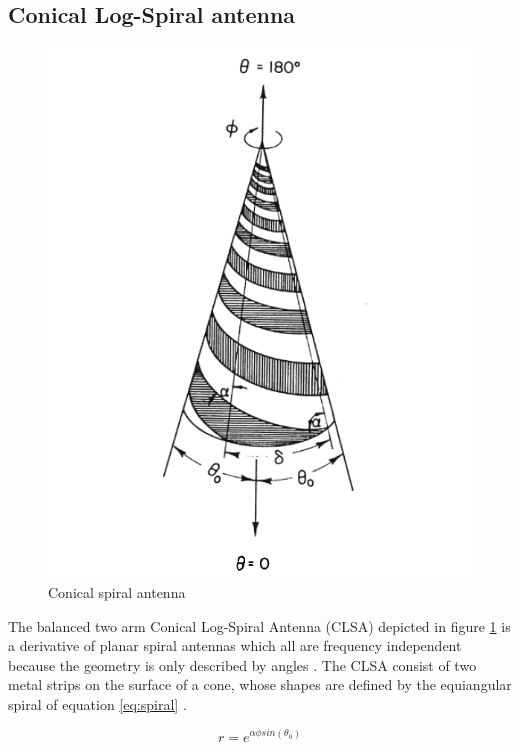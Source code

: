 \subsection{Conical Log-Spiral antenna}

\begin{figure}[H]
\centering 
\includegraphics[scale = 0.5]{figures/antennas/spiral/conical_spiral}
\caption{Conical spiral antenna \citep{Rumsey1966}}
\label{fig:con_spi}
\end{figure}


The balanced two arm Conical Log-Spiral Antenna (CLSA) depicted in figure \ref{fig:con_spi} is a derivative of planar spiral antennas which all are frequency independent because the geometry is only described by angles \citep{Balanis2005}. The CLSA consist of two metal strips on the surface of a cone, whose shapes are defined by the equiangular spiral of equation \ref{eq:spiral} \citep{Rumsey1966}.

\begin{equation}
r = e^{\alpha\phi sin(\theta_0)}
\end{equation}
\label{eq:spiral} 

